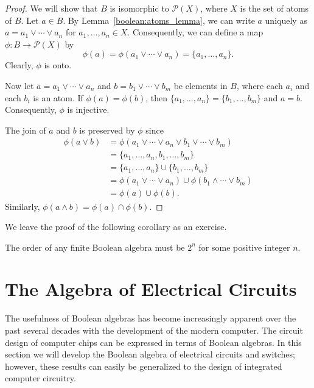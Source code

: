  
\begin{proof} 
We will show that $B$ is isomorphic to ${\mathcal P}(X)$, where $X$ is the
set of atoms of $B$. Let $a \in B$. By Lemma~\ref{boolean:atoms_lemma}, we can write $a$
uniquely as $a = a_1 \vee \cdots \vee a_n$ for $a_1, \ldots, a_n \in
X$. Consequently, we can define a  map $\phi : B \rightarrow {\mathcal
P}(X)$ by  
\[
\phi(a) = \phi(  a_1 \vee \cdots \vee a_n ) = \{a_1, \ldots, a_n \}.
\]
Clearly, $\phi$ is onto.
 
 
Now let $a = a_1 \vee \cdots \vee a_n$ and $b = b_1 \vee \cdots
\vee b_m$ be elements in $B$, where each $a_i$ and each $b_i$ is an
atom. If $\phi(a) = \phi(b)$, then $\{a_1, \ldots, a_n \} = \{b_1,
\ldots, b_m \}$ and $a = b$. Consequently, $\phi$ is injective.
 
 
The join of $a$ and $b$ is preserved by $\phi$ since
\begin{align*}
\phi(a \vee b) & = \phi( a_1 \vee \cdots \vee a_n \vee b_1 \vee
\cdots \vee b_m ) \\
& = \{ a_1, \ldots, a_n, b_1, \ldots, b_m \} \\
& = \{ a_1, \ldots, a_n \} \cup \{ b_1, \ldots, b_m \} \\
& = \phi( a_1 \vee \cdots \vee a_n ) \cup \phi( b_1 \wedge \cdots
\vee b_m ) \\ 
& = \phi(a) \cup \phi(b).
\end{align*}
Similarly, $\phi( a \wedge b ) = \phi(a) \cap \phi(b)$.
\end{proof}
 
 
\medskip
 
 
We leave the proof of the following corollary as an exercise.
 
 
\begin{corollary}
The order of any finite Boolean algebra must be $2^n$ for some
positive integer $n$.
\end{corollary}
 
 
 
\section{The Algebra of Electrical Circuits}
 
 
The usefulness of Boolean algebras has become increasingly apparent
over the past several decades with the development of the modern
computer. The circuit design of computer chips can be expressed in
terms of Boolean algebras. In this section we will develop the Boolean
algebra of electrical circuits and switches; however, these results
can easily be generalized to the design of integrated computer
circuitry.  
 
